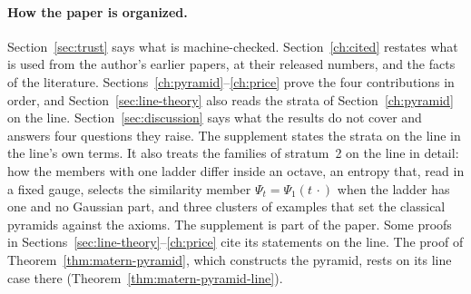 \paragraph{How the paper is organized.} Section~\ref{sec:trust} says what is machine-checked.
Section~\ref{ch:cited} restates what is used from the author's earlier papers, at their released
numbers, and the facts of the literature. Sections~\ref{ch:pyramid}--\ref{ch:price} prove the four
contributions in order, and Section~\ref{sec:line-theory} also reads the strata of
Section~\ref{ch:pyramid} on the line. Section~\ref{sec:discussion} says what the results do not
cover and answers four questions they raise. The supplement states the strata on the line in the line's own
terms. It also treats the families of stratum~2 on the line in detail: how the members with one
ladder differ inside an octave, an entropy that, read in a fixed gauge, selects the similarity
member $\Psi_t = \Psi_1(t\,\cdot)$ when the ladder has one and no Gaussian part, and three clusters of examples that set the classical pyramids against
the axioms. The supplement is part of the paper. Some proofs in
Sections~\ref{sec:line-theory}--\ref{ch:price} cite its statements on the line. The proof of Theorem~\ref{thm:matern-pyramid}, which constructs
the \Matern{} pyramid, rests on its line case there (Theorem~\ref{thm:matern-pyramid-line}).

